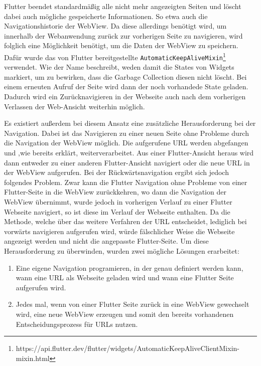 Flutter beendet standardmäßig alle nicht mehr angezeigten Seiten und löscht dabei auch mögliche gespeicherte Informationen. So etwa auch die Navigationshistorie der WebView.
Da diese allerdings benötigt wird, um innerhalb der Webanwendung zurück zur vorherigen Seite zu navigieren, wird folglich eine Möglichkeit benötigt, um die Daten der WebView zu speichern. Dafür wurde das von Flutter bereitgestellte \verb|AutomaticKeepAliveMixin|\footnote{https://api.flutter.dev/flutter/widgets/AutomaticKeepAliveClientMixin-mixin.html} verwendet. 
Wie der Name beschreibt, weden damit die States von Widgets markiert, um zu bewirken, dass die Garbage Collection diesen nicht löscht. 
Bei einem erneuten Aufruf der Seite wird dann der noch vorhandede State geladen. Dadurch wird ein Zurücknavigieren in der Webseite auch nach dem vorherigen Verlassen der Web-Ansicht weiterhin möglich.

Es existiert außerdem bei diesem Ansatz eine zusätzliche Herausforderung bei der Navigation.
Dabei ist das Navigieren zu einer neuen Seite ohne Probleme durch die Navigation der WebView möglich. Die aufgerufene URL werden abgefangen und ,wie bereits erklärt, weiterverarbeitet. Aus einer Flutter-Ansicht heraus wird dann entweder zu einer anderen Flutter-Ansicht navigiert oder die neue URL in der WebView aufgerufen. Bei der Rückwärtsnavigation ergibt sich jedoch folgendes Problem. Zwar kann die Flutter Navigation ohne Probleme von einer Flutter-Seite in die WebView zurückkehren, wo dann die Navigation der WebView übernimmt, wurde jedoch in vorherigen Verlauf zu einer Flutter Webseite navigiert, so ist diese im Verlauf der Webseite enthalten. Da die Methode, welche über das weitere Verfahren der URL entscheidet, lediglich bei vorwärts navigieren aufgerufen wird, würde fälschlicher Weise die Webseite angezeigt werden und nicht die angepasste Flutter-Seite.
Um diese Herausforderung zu überwinden, wurden zwei mögliche Lösungen erarbeitet:
\begin{enumerate}
    \item Eine eigene Navigation programieren, in der genau definiert werden kann, wann eine URL als Webseite geladen wird und wann eine Flutter Seite aufgerufen wird. 
    \item Jedes mal, wenn von einer Flutter Seite zurück in eine WebView gewechselt wird, eine neue WebView erzeugen und somit den bereits vorhandenen Entscheidungsprozess für URLs nutzen. 
\end{enumerate}

